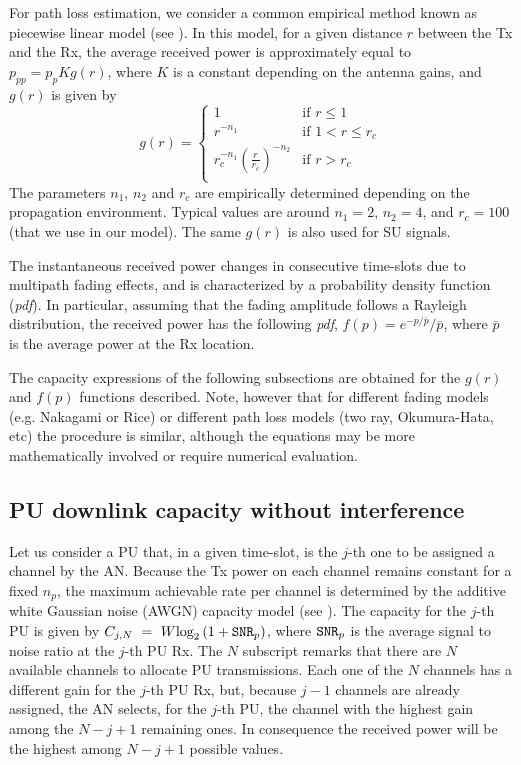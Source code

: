 For path loss estimation, we consider a common empirical method known as piecewise linear model (see \cite{ref:Goldsmith2005}). In this model, for a given distance $r$ between the Tx and the Rx, the average received power is approximately equal to $p_{pp}=p_{p}Kg(r)$, where $K$ is a constant depending on the antenna gains, and $g(r)$ is given by
\begin{equation}
g(r) =  
\begin{cases}
1 &\mbox{if }r\leq 1\\
r^{-n_{1}} &\mbox{if }1<r\leq r_{c}\\
r_{c}^{-n_{1}}\left(\frac{r}{r_{c}}\right)^{-n_{2}} &\mbox{if }r> r_{c}\\
\end{cases}
\end{equation}
The parameters $n_{1}$, $n_{2}$ and $r_{c}$ are empirically determined depending on the propagation environment. Typical values are around $n_{1}=2$, $n_{2}=4$, and $r_{c}=100$ (that we use in our model).
The same $g(r)$ is also used for SU signals.

The instantaneous received power changes in consecutive time-slots due to multipath fading effects, and is characterized by a probability density function (\textit{pdf}).
In particular, assuming that the fading amplitude follows a Rayleigh distribution, the received power has the following \textit{pdf}, $f(p)=e^{-p/\bar{p}}/\bar{p}$, where $\bar{p}$ is the average power at the Rx location.


The capacity expressions of the following subsections are obtained for the $g(r)$ and $f(p)$ functions described. Note, however that for different fading models (e.g. Nakagami or Rice) or different path loss models (two ray, Okumura-Hata, etc) the procedure is similar, although the equations may be more mathematically involved or require numerical evaluation. 

\subsection{PU downlink capacity without interference}
Let us consider a PU that, in a given time-slot, is the $j$-th one to be assigned a channel by the AN. 
Because the Tx power on each channel remains constant for a fixed $n_{p}$, the maximum achievable rate per channel is determined by the additive white Gaussian noise (AWGN) capacity model (see \cite{ref:Goldsmith2005}).
The capacity for the $j$-th PU is given by $C_{j,N}~=~W\text{log}_{2}\left(1+\text{\ttfamily{SNR}}_{p}\right)$, where $\text{\ttfamily{SNR}}_{p}$ is the average signal to noise ratio at the $j$-th PU Rx.
The $N$ subscript remarks that there are $N$ available channels to allocate PU transmissions.
Each one of the $N$ channels has a different gain for the $j$-th PU Rx, but, because $j-1$ channels are already assigned, the AN selects, for the $j$-th PU, the channel with the highest gain among the $N-j+1$ remaining ones. 
In consequence the received power will be the highest among $N-j+1$ possible values. 

